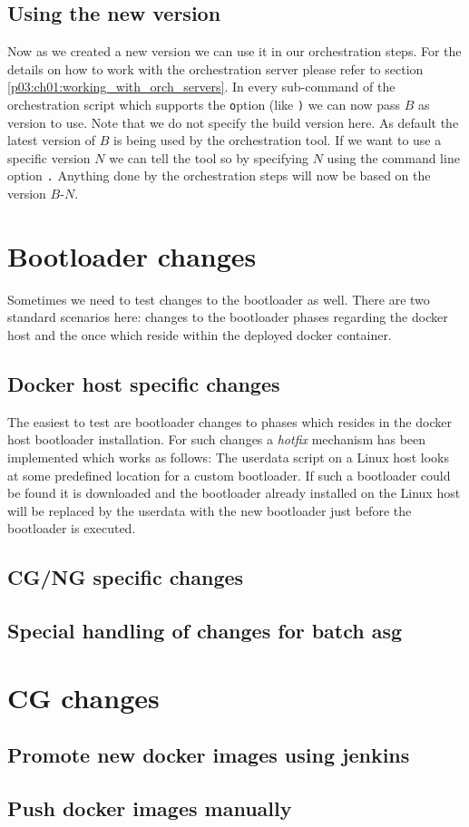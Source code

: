 		\subsection{Using the new \axceleratepod{} version}
		Now as we created a new \axceleratepod{} version we can use it in our orchestration steps. For the details on how to work with the orchestration server please refer to section \ref{p03:ch01:working_with_orch_servers}. In every sub-command of the orchestration script which supports the \texttt option (like \texttt) we can now pass $B$ as \axceleratepod{} version to use. Note that we do not specify the build version here. As default the latest version of $B$ is being used by the orchestration tool. If we want to use a specific version $N$ we can tell the tool so by specifying $N$ using the command line option \texttt. Anything done by the orchestration steps will now be based on the \axceleratepod{} version $B$-$N$.
	\section{Bootloader changes}
	Sometimes we need to test changes to the bootloader as well. There are two standard scenarios here: changes to the bootloader phases regarding the docker host and the once which reside within the deployed docker container. 
		\subsection{Docker host specific changes}
		The easiest to test are bootloader changes to phases which resides in the docker host bootloader installation. For such changes a \emph{hotfix} mechanism has been implemented which works as follows: The userdata script on a Linux host looks at some predefined location for a custom bootloader. If such a bootloader could be found it is downloaded and the bootloader already installed on the Linux host will be replaced by the userdata with the new bootloader just before the bootloader is executed.
		\subsection{CG/NG specific changes}
		\subsection{Special handling of changes for batch asg}
	\section{CG changes}
		\subsection{Promote new docker images using jenkins}
		\subsection{Push docker images manually}